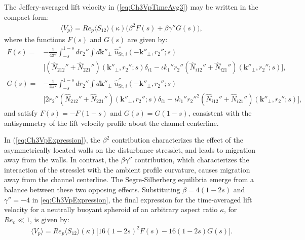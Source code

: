 \documentclass{jfm}
\begin{document}
The Jeffery-averaged lift velocity in (\ref{eq:Ch3VpTimeAvg3}) may be written in the compact form:
\begin{align}
\langle V_p\rangle=Re_p\langle S_{12}\rangle(\kappa)\Big(\beta^2 F(s)+\beta\gamma''G(s)\Big),
\label{eq:Ch3VpExpression}
\end{align}
where the functions $F(s)$ and $G(s)$ are given by:
\begin{align}
F(s)=&-\frac{1} {4\pi^2} \int_{-s}^{1-s} dr_2''\int d\bm{k}''_\perp\,\, \hat{u}_{\text{St},i}^{''} (-\bm{k}''_\perp,r_2'';s) \nonumber\\
&\big[(\hat{N}_{212}''+\hat{N}_{221}'') (\bm{k}''_\perp,r_2'';s)\delta_{i1}-\iota k_1'' r_2'' (\hat{N}_{i12}''+\hat{N}_{i21}'') (\bm{k}''_\perp,r_2'';s)\big], \label{eq:Ch3FsPrimitive}\\
G(s)=&-\frac{1} {4\pi^2} \int_{-s}^{1-s} dr_2''\int d\bm{k}''_\perp\,\, \hat{u}_{\text{St},i}^{''} (-\bm{k}''_\perp,r_2'';s) \nonumber\\
&\big[2 r_2''(\hat{N}_{212}''+\hat{N}_{221}'') (\bm{k}''_\perp,r_2'';s)\delta_{i1}-\iota k_1''r_2''^2 (\hat{N}_{i12}''+\hat{N}_{i21}'') (\bm{k}''_\perp,r_2'';s)\big], \label{eq:Ch3GsPrimitive}
\end{align}
and satisfy $F(s)=-F(1-s)$ and $G(s)=G(1-s)$, consistent with the antisymmetry of the lift velocity profile about the channel centerline.

In  (\ref{eq:Ch3VpExpression}), the $\beta^2$ contribution characterizes the effect of the asymmetrically located walls on the disturbance stresslet, and leads to migration away from the walls. In contrast, the $\beta\gamma''$ contribution, which characterizes the interaction of the stresslet with the ambient profile curvature, causes migration away from the channel centerline. The Segre-Silberberg equilibria emerge from a balance between these two opposing effects. Substituting $\beta=4(1-2s)$ and $\gamma''=-4$ in \eqref{eq:Ch3VpExpression}, the final expression for the time-averaged lift velocity for a neutrally buoyant spheroid of an arbitrary aspect ratio $\kappa$, for $Re_c\ll1$, is given by:
\begin{align}
\langle V_p\rangle=Re_p\langle S_{12}\rangle(\kappa)\big[16(1-2s)^2 F(s)-16(1-2s)G(s)\big].
\label{eq:Ch3VpFinalExpressionsmallRec}
\end{align}
\end{document}
